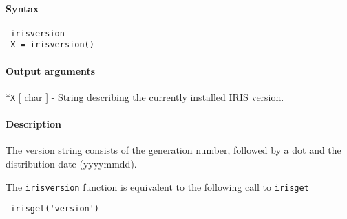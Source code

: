 


	\paragraph{Syntax}
 
 \begin{verbatim}
 irisversion
 X = irisversion()
 \end{verbatim}
 
 \paragraph{Output arguments}
 
 *\texttt{X} {[} char {]} - String describing the currently installed
 IRIS version.
 
 \paragraph{Description}
 
 The version string consists of the generation number, followed by a dot
 and the distribution date (yyyymmdd).
 
 The \texttt{irisversion} function is equivalent to the following call to
 \href{config/irisget}{\texttt{irisget}}
 
 \begin{verbatim}
 irisget('version')
 \end{verbatim}


